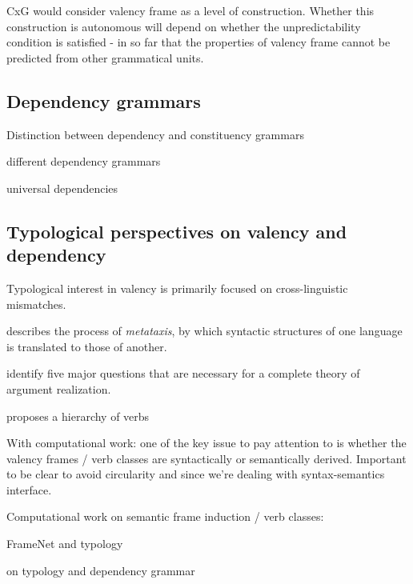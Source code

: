 CxG would consider valency frame as a level of construction. Whether this construction is autonomous will depend on whether the unpredictability condition is satisfied - in so far that the properties of valency frame cannot be predicted from other grammatical units.


\subsection{Dependency grammars}

Distinction between dependency and constituency grammars \citep{stabler2019}

different dependency grammars \citet{demarneffe2019}

universal dependencies \citep{demarneffe2021}



\subsection{Typological perspectives on valency and dependency}

Typological interest in valency is primarily focused on cross-linguistic mismatches.

\citet{tesniere1959} describes the process of \textit{metataxis}, by which syntactic structures of one language is translated to those of another.  

\citet{levin2005} identify five major questions that are necessary for a complete theory of argument realization.


\citet{tsunoda1981, tsunoda1985} proposes a hierarchy of verbs

With computational work: one of the key issue to pay attention to is whether the valency frames / verb classes are syntactically or semantically derived. Important to be clear to avoid circularity and since we're dealing with syntax-semantics interface.

Computational work on semantic frame induction / verb classes:  \citet{abend2009, basili1993, bickel2014, dowty1991, fellbaum1998, fillmore1968, furstenau2012, kipper-schuler2005, kipper2008, korhonen2006, levin2015, majewska2018, majewska2020, majewska2021, miller1990, miller1995, navarretta2000, palmer2005, say2014, sayeed2018, schulteimwalde2002, schulteimwalde2003, schulteimwalde2006, snider2006, sun2008, sun2009, sun2013, titov2012, watanabe2010, yamada2021} 

\citet{baker2020, ellsworth2021} FrameNet and typology

\citet{croft2017} on typology and dependency grammar
\citet{croft2012} 

